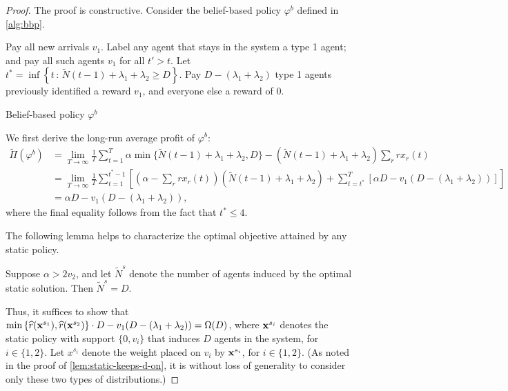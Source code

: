 \documentclass[12pt]{article}
\begin{document}
\begin{proof}
The proof is constructive. Consider the {belief-based} policy $\varphi^b$ defined in \cref{alg:bbp}.%

\begin{algorithm}
\begin{algorithmic}
\State Pay all new arrivals $v_1$.
\State Label any agent that stays in the system a type 1 agent; and pay all such agents $v_1$ 
\State for all $t' > t$.
\EndIf
\State Let $t^* = \inf\left\{t\, : \, \widetilde{N}(t-1) + \lambda_1 + \lambda_2 \geq D\right\}$.
{}
\State Pay $D-\left(\lambda_1 + \lambda_2\right)$ type 1 agents previously identified a reward $v_1$, and everyone else a \State reward of 0.
\EndIf
\EndFor
\end{algorithmic}
	\caption{Belief-based policy $\varphi^b$\label{alg:bbp}}
\end{algorithm}

We first derive the long-run average profit of $\varphi^b$:
\begin{align*}
    \widetilde{\Pi}(\varphi^b) &= \lim_{T\to\infty} \frac1T \sum_{t=1}^T \alpha\min\{\widetilde{N}(t-1)+\lambda_1 + \lambda_2,D\} - \left(\widetilde{N}(t-1)+\lambda_1 + \lambda_2\right)\sum_r rx_r(t) \\ 
    &= \lim_{T\to\infty}\frac1T \sum_{t=1}^{t^*-1} \left[\left(\alpha-\sum_r rx_r(t)\right) \left(\widetilde{N}(t-1)+\lambda_1 + \lambda_2\right) +\sum_{t=t^*}^T\left[\alpha D - v_1(D-(\lambda_1 + \lambda_2))\right]\right] \\
    &= \alpha D - v_1(D-(\lambda_1 + \lambda_2)),
\end{align*}
where the final equality follows from the fact that $t^* \leq 4$.


The following lemma helps to characterize the optimal objective attained by any static policy. 
\begin{lemma}\label{lem:static-keeps-d-on}
Suppose $\alpha > 2v_2$, and let $\widetilde{N}^s$ denote the number of agents induced by the optimal static solution. Then $\widetilde{N}^s = D$.
\end{lemma}

 Thus, it suffices to show that
    $\min\left\{\widehat{r}(\mathbf{x}^{s_1}),\widehat{r}(\mathbf{x}^{s_2})\right\}\cdot D - v_1(D-(\lambda_1 + \lambda_2)) = \Omega(D)$,
where $\mathbf{x}^{s_i}$ denotes the static policy with support $\{0,v_i\}$ that induces $D$ agents in the system, for $i \in \{1,2\}$. Let $x^{s_i}$ denote the weight placed on $v_i$ by $\mathbf{x}^{s_i}$, for $i \in \{1,2\}$. (As noted in the proof of \cref{lem:static-keeps-d-on}, it is without loss of generality to consider only these two types of distributions.) 



\end{proof}
\end{document}
